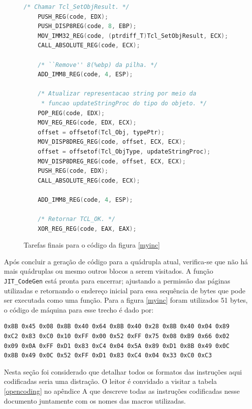 \begin{figure}[ht!]
  \centering
  \begin{lstlisting}[language=C]
    /* Chamar Tcl_SetObjResult. */
    PUSH_REG(code, EDX);
    PUSH_DISP8REG(code, 8, EBP);
    MOV_IMM32_REG(code, (ptrdiff_T)Tcl_SetObjResult, ECX);
    CALL_ABSOLUTE_REG(code, ECX);

    /* ``Remove'' 8(%ebp) da pilha. */
    ADD_IMM8_REG(code, 4, ESP);

    /* Atualizar representacao string por meio da
     * funcao updateStringProc do tipo do objeto. */
    POP_REG(code, EDX);
    MOV_REG_REG(code, EDX, ECX);
    offset = offsetof(Tcl_Obj, typePtr);
    MOV_DISP8DREG_REG(code, offset, ECX, ECX);
    offset = offsetof(Tcl_ObjType, updateStringProc);
    MOV_DISP8DREG_REG(code, offset, ECX, ECX);
    PUSH_REG(code, EDX);
    CALL_ABSOLUTE_REG(code, ECX);

    ADD_IMM8_REG(code, 4, ESP);

    /* Retornar TCL_OK. */
    XOR_REG_REG(code, EAX, EAX);
  \end{lstlisting}
  \caption{Tarefas finais para o código da figura \ref{myinc}\label{myinc-last}}
\end{figure}

Após concluir a geração de código para a quádrupla atual, verifica-se
que não há mais quádruplas ou mesmo outros blocos a serem visitados. A função
\verb!JIT_CodeGen! está pronta para encerrar; ajustando a permissão
das páginas utilizadas e retornando
o endereço inicial para essa sequência de bytes que pode ser executada
como uma função. Para a figura \ref{myinc} foram utilizados 51 bytes,
o código de máquina para esse trecho é dado por:
\begin{verbatim}
0x8B 0x45 0x08 0x8B 0x40 0x64 0x8B 0x40 0x28 0x8B 0x40 0x04 0x89
0xC2 0x83 0xC0 0x10 0xFF 0x00 0x52 0xFF 0x75 0x08 0xB9 0x66 0x02
0x09 0x0A 0xFF 0xD1 0x83 0xC4 0x04 0x5A 0x89 0xD1 0x8B 0x49 0x0C
0x8B 0x49 0x0C 0x52 0xFF 0xD1 0x83 0xC4 0x04 0x33 0xC0 0xC3
\end{verbatim}


Nesta seção foi considerado que detalhar todos os formatos das instruções aqui
codificadas seria uma distração. O leitor é convidado a visitar a
tabela \ref{opencoding} no apêndice A que descreve todas as instruções
codificadas nesse documento juntamente com os nomes das macros utilizadas.



